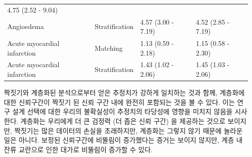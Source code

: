 \documentclass[11pt]{book}
\theoremstyle{definition}
\theoremstyle{definition}
\theoremstyle{definition}
\theoremstyle{remark}
\begin{document}
\begin{longtable}[]{@{}llll@{}}
\begin{minipage}[t]{0.17\columnwidth}
4.75 (2.52 - 9.04)\strut
\end{minipage}\tabularnewline
\begin{minipage}[t]{0.27\columnwidth}\raggedright\strut
Angioedema\strut
\end{minipage} & \begin{minipage}[t]{0.15\columnwidth}\raggedright\strut
Stratification\strut
\end{minipage} & \begin{minipage}[t]{0.17\columnwidth}\raggedright\strut
4.57 (3.00 - 7.19)\strut
\end{minipage} & \begin{minipage}[t]{0.17\columnwidth}\raggedright\strut
4.52 (2.85 - 7.19)\strut
\end{minipage}\tabularnewline
\begin{minipage}[t]{0.27\columnwidth}\raggedright\strut
Acute myocardial infarction\strut
\end{minipage} & \begin{minipage}[t]{0.15\columnwidth}\raggedright\strut
Matching\strut
\end{minipage} & \begin{minipage}[t]{0.17\columnwidth}\raggedright\strut
1.13 (0.59 - 2.18)\strut
\end{minipage} & \begin{minipage}[t]{0.17\columnwidth}\raggedright\strut
1.15 (0.58 - 2.30)\strut
\end{minipage}\tabularnewline
\begin{minipage}[t]{0.27\columnwidth}\raggedright\strut
Acute myocardial infarction\strut
\end{minipage} & \begin{minipage}[t]{0.15\columnwidth}\raggedright\strut
Stratification\strut
\end{minipage} & \begin{minipage}[t]{0.17\columnwidth}\raggedright\strut
1.43 (1.02 - 2.06)\strut
\end{minipage} & \begin{minipage}[t]{0.17\columnwidth}\raggedright\strut
1.45 (1.03 - 2.06)\strut
\end{minipage}\tabularnewline
\bottomrule
\end{longtable}

짝짓기와 계층화된 분석으로부터 얻은 추정치가 강하게 일치하는 것과 함께,
계층화에 대한 신뢰구간이 짝짓기 된 신뢰 구간 내에 완전히 포함되는 것을
볼 수 있다. 이는 연구 설계 선택에 대한 우리의 불확실성이 추정치의
타당성에 영향을 미치지 않음을 시사한다. 계층화는 우리에게 더 큰 검정력
(더 좁은 신뢰 구간) 을 제공하는 것으로 보이지만, 짝짓기는 많은 데이터의
손실을 초래하지만, 계층화는 그렇지 않기 때문에 놀라운 일은 아니다.
보정된 신뢰구간에 비뚤림이 증가했다는 증거는 보이지 않지만, 계층 내 잔류
교란으로 인한 대가로 비뚤림이 증가할 수 있다.
\end{document}
